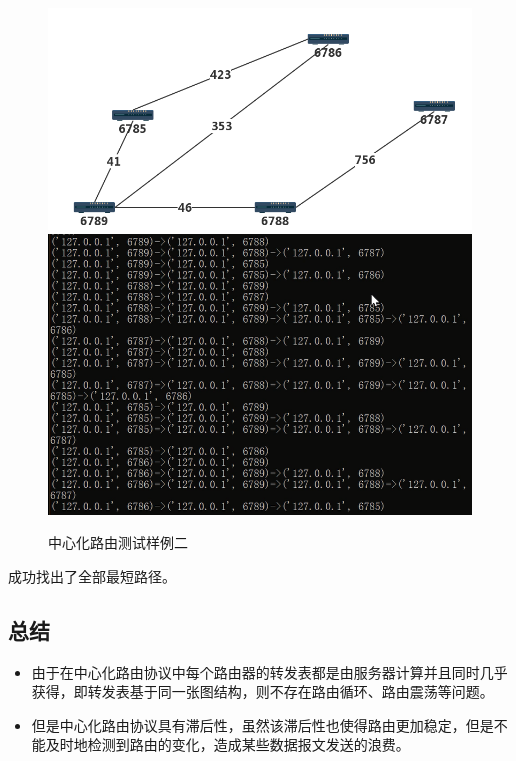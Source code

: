 		\begin{figure}[H]
			\centering
			\includegraphics[scale=0.4]{imgs/topo3/topo2.png}
			\includegraphics[scale=1]{imgs/cenTest2.PNG}
			\caption{中心化路由测试样例二}
			\label{fig:CentralizedTest2}
		\end{figure}
		成功找出了全部最短路径。
	\subsection{总结} %
	\label{sub:总结}
		\begin{itemize}
			\item 由于在中心化路由协议中每个路由器的转发表都是由服务器计算并且同时几乎获得，即转发表基于同一张图结构，则不存在路由循环、路由震荡等问题。
			\item 但是中心化路由协议具有滞后性，虽然该滞后性也使得路由更加稳定，但是不能及时地检测到路由的变化，造成某些数据报文发送的浪费。
		\end{itemize}

